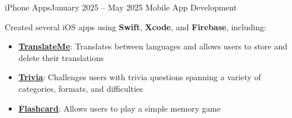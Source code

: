 
\subheading
    {iPhone Apps}{January 2025 -- May 2025}
    {Mobile App Development}{}
    \itemListStart
    \listItem{}
        {Created several iOS apps using \textbf{Swift}, \textbf{Xcode}, and \textbf{Firebase}, including:
        \begin{itemize}
            \item \href{https://github.com/lynkos/translate-me}{\textbf{TranslateMe}}: Translates between languages and allows users to store and delete their translations
            \item \href{https://github.com/lynkos/trivia}{\textbf{Trivia}}: Challenges users with trivia questions spanning a variety of categories, formats, and difficulties
            \item \href{https://github.com/lynkos/flashcard}{\textbf{Flashcard}}: Allows users to play a simple memory game
        \end{itemize}
        }
    \itemListEnd